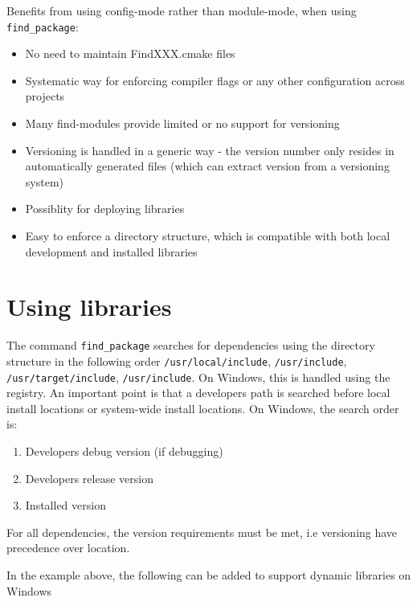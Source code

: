\documentclass[12pt,a4wide]{article}
\begin{document}
Benefits from using config-mode rather than module-mode, when using \lstinline{find_package}:
\begin{itemize}
 \item No need to maintain FindXXX.cmake files
 \item Systematic way for enforcing compiler flags or any other configuration across projects
 \item  Many find-modules provide limited or no support for versioning
 \item Versioning is handled in a generic way - the version number only
   resides in automatically generated files (which can extract version
   from a versioning system)
 \item Possiblity for deploying libraries
 \item Easy to enforce a directory structure, which is compatible with
   both local development and installed libraries
\end{itemize}

\section{Using libraries}
The command \lstinline{find_package} searches for dependencies using the directory structure in the
following order \lstinline{/usr/local/include},
\lstinline{/usr/include}, \lstinline{/usr/target/include},
\lstinline{/usr/include}. On Windows, this is handled using the
registry. An important point is that a developers path is searched
before local install locations or system-wide install
locations. On Windows, the search order is:
\begin{enumerate}
  \item Developers debug version (if debugging)
  \item Developers release version
  \item Installed version
\end{enumerate}
For all dependencies, the version requirements must be met, i.e
versioning have precedence over location.

In the example above, the following can be added to support dynamic
libraries on Windows
\end{document}
